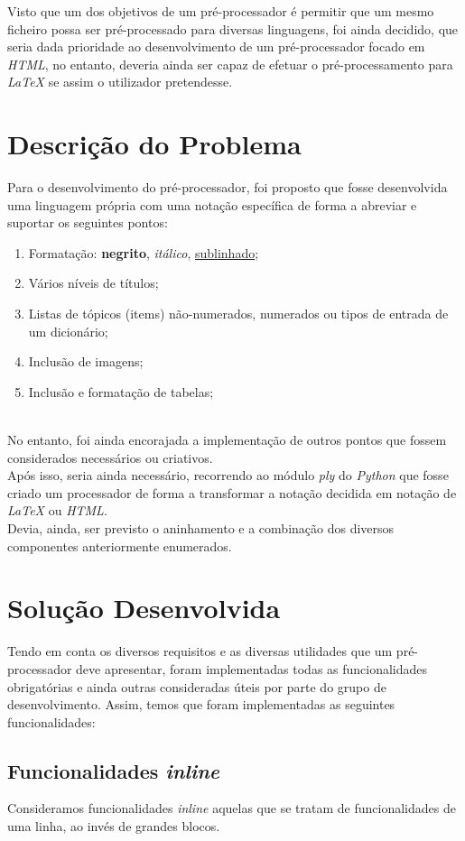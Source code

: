 \documentclass{article}
\begin{document}
 Visto que um dos objetivos de um pré-processador é permitir que um mesmo ficheiro possa ser pré-processado para diversas linguagens, foi ainda decidido, que seria dada prioridade ao desenvolvimento de um pré-processador focado em \textit{HTML}, no entanto, deveria ainda ser capaz de efetuar o pré-processamento para \textit{LaTeX} se assim o utilizador pretendesse.\section{Descrição do Problema}
Para o desenvolvimento do pré-processador, foi proposto que fosse desenvolvida uma linguagem própria com uma notação específica de forma a abreviar e suportar os seguintes pontos: 
\begin{enumerate}
\item Formatação: \textbf{negrito}, \textit{itálico}, \underline{sublinhado};
\item Vários níveis de títulos;
\item Listas de tópicos (items) não-numerados, numerados ou tipos de entrada de um dicionário;
\item Inclusão de imagens;
\item Inclusão e formatação de tabelas;
\end{enumerate}
\\
 No entanto, foi ainda encorajada a implementação de outros pontos que fossem considerados necessários ou criativos.\\
 Após isso, seria ainda necessário, recorrendo ao módulo \textit{ply} do \textit{Python} que fosse criado um processador de forma a transformar a notação decidida em notação de \textit{LaTeX} ou \textit{HTML}.\\
 Devia, ainda, ser previsto o aninhamento e a combinação dos diversos componentes anteriormente enumerados.\section{Solução Desenvolvida}
Tendo em conta os diversos requisitos e as diversas utilidades que um pré-processador deve apresentar, foram implementadas todas as funcionalidades obrigatórias e ainda outras consideradas úteis por parte do grupo de desenvolvimento. Assim, temos que foram implementadas as seguintes funcionalidades: \subsection{Funcionalidades \textit{inline}}
Consideramos funcionalidades \textit{inline} aquelas que se tratam de funcionalidades de uma linha, ao invés de grandes blocos.\\
\end{document}
